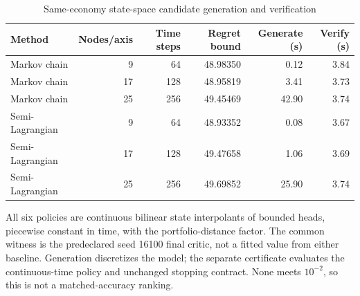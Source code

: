\begin{table}[htbp]\centering\small
\caption{Same-economy state-space candidate generation and verification}\label{tab:r16baselines}
\begin{tabular}{lrrrrr}
\toprule
Method & Nodes/axis & Time steps & Regret bound & Generate (s) & Verify (s)\\\midrule
Markov chain & 9 & 64 & 48.98350 & 0.12 & 3.84\\
Markov chain & 17 & 128 & 48.95819 & 3.41 & 3.73\\
Markov chain & 25 & 256 & 49.45469 & 42.90 & 3.74\\
Semi-Lagrangian & 9 & 64 & 48.93352 & 0.08 & 3.67\\
Semi-Lagrangian & 17 & 128 & 49.47658 & 1.06 & 3.69\\
Semi-Lagrangian & 25 & 256 & 49.69852 & 25.90 & 3.74\\
\bottomrule\end{tabular}
\par\smallskip\footnotesize All six policies are continuous bilinear state interpolants of bounded heads, piecewise constant in time, with the portfolio-distance factor. The common witness is the predeclared seed 16100 final critic, not a fitted value from either baseline. Generation discretizes the model; the separate certificate evaluates the continuous-time policy and unchanged stopping contract. None meets $10^{-2}$, so this is not a matched-accuracy ranking.
\end{table}
